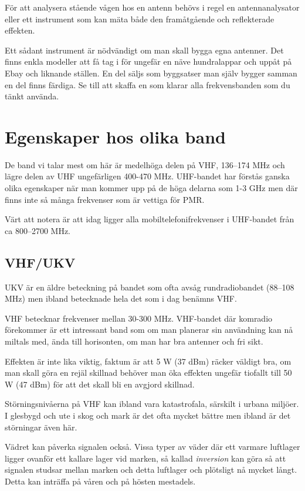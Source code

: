 \documentclass[12ypt,swedish,a4paper]{report}
\begin{document}
För att analysera stående vågen hos en antenn behövs i regel en antennanalysator eller ett instrument som kan mäta både den framåtgående och reflekterade effekten. 

Ett sådant instrument är nödvändigt om man skall bygga egna antenner. Det finns enkla modeller att få tag i för ungefär en näve hundralappar och uppåt på Ebay och liknande ställen. En del säljs som byggsatser man själv bygger samman en del finns färdiga. Se till att skaffa en som klarar alla frekvensbanden som du tänkt använda.


\section{Egenskaper hos olika band}

De band vi talar mest om här är medelhöga delen på VHF, 136--174 MHz och lägre delen av UHF ungefärligen 400-470 MHz. UHF-bandet har förstås ganska olika egenskaper när man kommer upp på de höga delarna som 1-3 GHz men där finns inte så många frekvenser som är vettiga för PMR.

Värt att notera är att idag ligger alla mobiltelefonifrekvenser i UHF-bandet från ca 800--2700 MHz.

\subsection{VHF/UKV}

UKV är en äldre beteckning på bandet som ofta avsåg rundradiobandet (88--108 MHz) men ibland betecknade hela det som i dag benämns VHF.

VHF betecknar frekvenser mellan 30-300 MHz. VHF-bandet där komradio förekommer är ett intressant band som om man planerar sin användning kan nå miltals med, ända till horisonten, om man har bra antenner och fri sikt. 

Effekten är inte lika viktig, faktum är att 5 W (37 dBm) räcker väldigt bra, om man skall göra en rejäl skillnad behöver man öka effekten ungefär tiofallt till 50 W (47 dBm) för att det skall bli en avgjord skillnad. 

Störningsnivåerna på VHF kan ibland vara katastrofala, särskilt i urbana miljöer. I glesbygd och ute i skog och mark är det ofta mycket bättre men ibland är det störningar även här. 

Vädret kan påverka signalen också. Vissa typer av väder där ett varmare luftlager ligger ovanför ett kallare lager vid marken, så kallad \textit{inversion} kan göra så att signalen studsar mellan marken och detta luftlager och plötsligt nå mycket långt. Detta kan inträffa på våren och på hösten mestadels.
\end{document}
